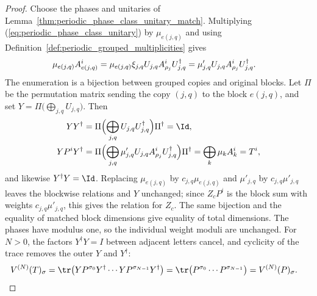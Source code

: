 \begin{proof}
    \leanok
    Choose the phases and unitaries of
    Lemma~\ref{thm:periodic_phase_class_unitary_match}. Multiplying
    (\ref{eq:periodic_phase_class_unitary}) by $\mu_{e(j,q)}$ and using
    Definition~\ref{def:periodic_grouped_multiplicities} gives
    \begin{align}
        \mu_{e(j,q)}A_{e(j,q)}^i
         & =\mu_{e(j,q)}\xi_{j,q}U_{j,q}A_{\rho_j}^iU_{j,q}^\dagger
        =\mu'_{j,q}U_{j,q}A_{\rho_j}^iU_{j,q}^\dagger. \notag
    \end{align}
    The enumeration is a bijection between grouped copies and original
    blocks. Let $\Pi$ be the permutation matrix sending the copy $(j,q)$ to the
    block $e(j,q)$, and set $Y=\Pi\bigl(\bigoplus_{j,q}U_{j,q}\bigr)$. Then
    \begin{align}
        YY^\dagger    & =\Pi\Bigl(\bigoplus_{j,q}U_{j,q}U_{j,q}^\dagger\Bigr)\Pi^\dagger=\Id,
        \notag                                                                                                 \\
        YP^iY^\dagger & =\Pi\Bigl(\bigoplus_{j,q}\mu'_{j,q}U_{j,q}A_{\rho_j}^iU_{j,q}^\dagger\Bigr)\Pi^\dagger
        =\bigoplus_k\mu_kA_k^i=T^i, \notag
    \end{align}
    and likewise $Y^\dagger Y=\Id$. Replacing $\mu_{e(j,q)}$ by
    $c_{j,q}\mu_{e(j,q)}$ and $\mu'_{j,q}$ by $c_{j,q}\mu'_{j,q}$ leaves the
    blockwise relations and $Y$ unchanged; since $Z_cP^i$ is the block sum with
    weights $c_{j,q}\mu'_{j,q}$, this gives the relation for $Z_c$.
    The same bijection and the equality of matched
    block dimensions give equality of total dimensions.
    The phases have modulus one, so the individual weight moduli are
    unchanged. For $N>0$, the factors $Y^\dagger Y=I$ between adjacent
    letters cancel, and cyclicity of the trace removes the outer $Y$ and
    $Y^\dagger$:
    \begin{align}
        V^{(N)}(T)_\sigma
         & =\tr\bigl(YP^{\sigma_0}Y^\dagger\cdots YP^{\sigma_{N-1}}Y^\dagger\bigr)
        =\tr\bigl(P^{\sigma_0}\cdots P^{\sigma_{N-1}}\bigr)
        =V^{(N)}(P)_\sigma. \notag
    \end{align}
\end{proof}

